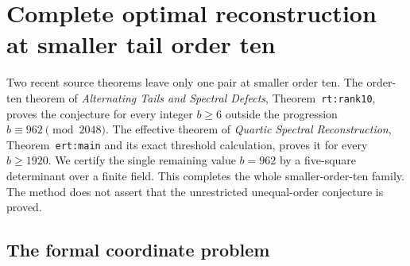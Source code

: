 \section{Complete optimal reconstruction at smaller tail order ten}
\label{t10:section}

Two recent source theorems leave only one pair at smaller order ten.
The order-ten theorem of \emph{Alternating Tails and Spectral Defects},
Theorem~\texttt{rt:rank10}, proves the conjecture for every integer
$b\ge6$ outside the progression $b\equiv962\pmod{2048}$.
The effective theorem of \emph{Quartic Spectral Reconstruction},
Theorem~\texttt{ert:main} and its exact threshold calculation,
proves it for every $b\ge1920$. We certify the single remaining
value $b=962$ by a five-square determinant over a finite field.
This completes the whole smaller-order-ten family. The method does
not assert that the unrestricted unequal-order conjecture is proved.

\subsection{The formal coordinate problem}

